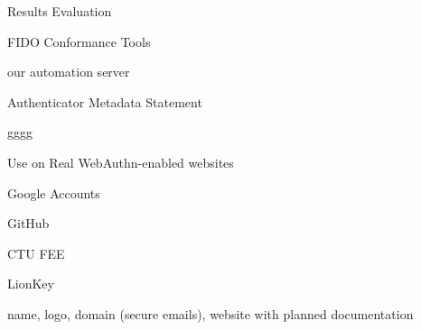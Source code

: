 \chap[evaluation] Results Evaluation


\sec FIDO Conformance Tools

our automation server

\secc Authenticator Metadata Statement

gggg

\sec Use on Real WebAuthn-enabled websites

Google Accounts

GitHub

CTU FEE


\sec LionKey

name, logo, domain (secure emails), website with planned documentation










